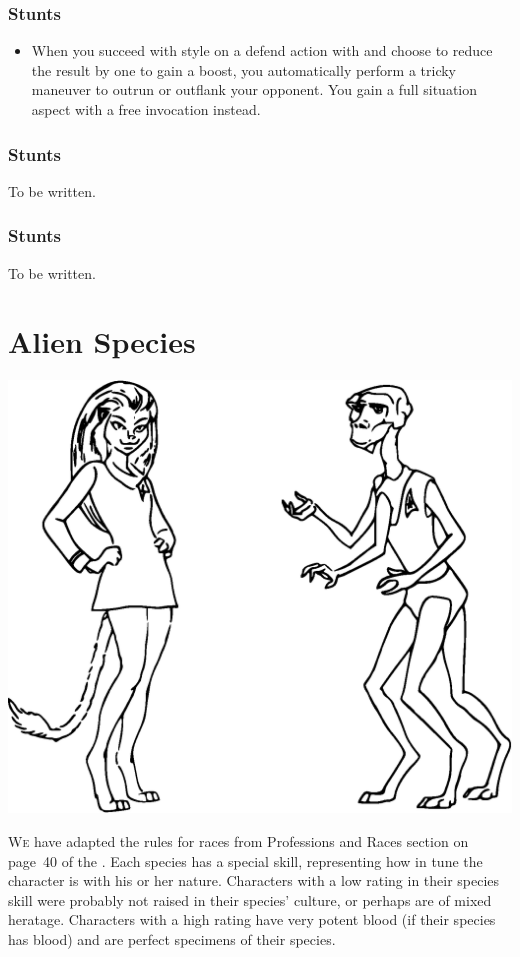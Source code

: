 \documentclass[12pt,titlepage,openany]{book}
\begin{document}
\subsection*{ Stunts}\label{subsec:pilot-stunts}

\begin{itemize}
    \item {} When you succeed with style on a defend action
        with  and choose to reduce the result by one to gain a
        boost, you automatically perform a tricky maneuver to outrun or
        outflank your opponent. You gain a full situation aspect with a free
        invocation instead.
\end{itemize}

\subsection*{ Stunts}\label{subsec:presence-stunts}

To be written.

\subsection*{ Stunts}\label{subsec:survival-stunts}

To be written.



\chapter{Alien Species}\label{chap:species}

\begin{center}
    \includegraphics[width=0.4\linewidth]{img/AlienSpecies.eps}
\end{center}

\lettrine[lines=1]{W}{e} have adapted the rules for races from Professions and
Races section on page~40 of the \FateSystemToolkit{}. Each species has a
special skill, representing how in tune the character is with his or her
nature. Characters with a low rating in their species skill were probably not
raised in their species' culture, or perhaps are of mixed heratage. Characters
with a high rating have very potent blood (if their species has blood) and are
perfect specimens of their species.
\end{document}
